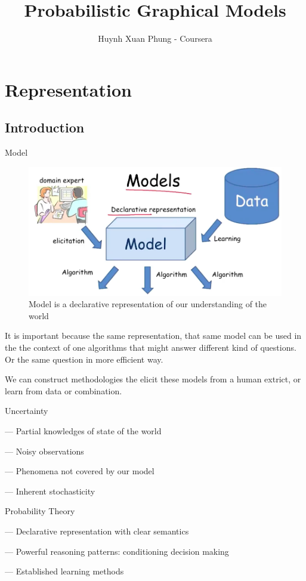 \documentclass{book}
\title{Probabilistic Graphical Models}
\author{Huynh Xuan Phung - Coursera}
\date{ }
\begin{document}
 
\maketitle
 
\tableofcontents

\chapter{Representation}

\section{Introduction}
Model 

\begin{figure}[h]
\centering
\includegraphics[width=0.7\linewidth]{figures/Models}
\caption{Model is a declarative representation of our understanding of the world}
\label{fig:models}
\end{figure}

It is important because the same representation, that same model can be used in the the context of one algorithms that might answer different kind of questions. Or the same question in more efficient way.

We can construct methodologies the elicit these models from a human extrict, or learn from data or combination.

Uncertainty

--- Partial knowledges of state of the world

--- Noisy observations

--- Phenomena not covered by our model

--- Inherent stochasticity

Probability Theory

--- Declarative representation with clear semantics

--- Powerful reasoning patterns: conditioning decision making

--- Established learning methods
\end{document}
